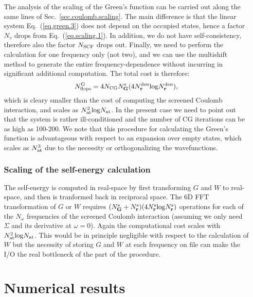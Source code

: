 \documentclass[twocolumn,prb,showpacs,superscriptaddress]{revtex4}
\def\w{\omega}
\def\G{{\bf G}}
\def\r{{\bf r}}
\begin{document}
The analysis of the scaling of the Green's function can be carried out along the same
lines of Sec.\ \ref{sec.coulomb.scaling}. The main difference is that the linear system
Eq.\ (\ref{eq.green.3}) does not depend on the occupied states, hence a factor $N_v$
drops from Eq.\ (\ref{eq.scaling.1}). In addition, we do not have self-consistency,
therefore also the factor $N_{\rm SCF}$ drops out. Finally, we need to perform the
calculation for one frequency only (not two), and we can use the multishift method
to generate the entire frequency-dependence without incurring in significant additional computation.
The total cost is therefore:
   \begin{equation}\label{eq.scaling.3}
   N^{\rm G}_{\rm flops} = 4 N_{\rm CG} N_\G^{\rm s} ( 4 N_\r^{\rm den} {\rm log} N_\r^{\rm den}),
   \end{equation}
which is cleary smaller than the cost of computing the screened Coulomb interaction,
and scales as $N_{\rm at}^2 {\rm log} N_{\rm at}$.
In the present case we need to point out that the system is rather ill-conditioned
and the number of CG iterations can be as high as 100-200.
We note that this procedure for calculating the Green's function is advantageous
with respect to an expansion over empty states, which scales as $N_{\rm at}^3$ due
to the necessity or orthogonalizing the wavefunctions.

\subsubsection{Scaling of the self-energy calculation}\label{sec.sigma.scaling}

The self-energy is computed in real-space by first transforming $G$ and $W$ to
real-space, and then is tranformed back in reciprocal space.
The 6D FFT transformation of $G$ or $W$ requires $(N_\G^{\rm s}+N_\r^{\rm s})(4 N_\r^{\rm s} {\rm log} N_\r^{\rm s})$
operations for each of the $N_\w$ frequencies of the screened Coulomb interaction
(assuming we only need $\Sigma$ and its derivative at $\w=0$).
Again the computational cost scales with $N_{\rm at}^2 {\rm log} N_{\rm at}$.
This would be in principle negligible with respect to the calculation of $W$
but the necessity of storing $G$ and $W$ at each frequency on file can
make the I/O the real bottleneck of the part of the procedure.

\section{Numerical results}\label{sec.results}
\end{document}
